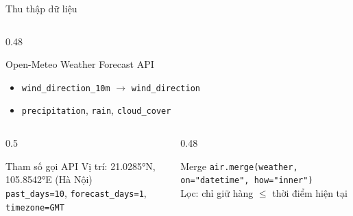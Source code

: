 \documentclass[aspectratio=169]{beamer}
\begin{document}
\begin{frame}{Thu thập dữ liệu}
\begin{columns}[T]
\begin{column}{0.48\textwidth}
\begin{block}{Open-Meteo Weather Forecast API}
\begin{itemize}
          \item \texttt{wind\_direction\_10m} $\to$ \texttt{wind\_direction}
          \item \texttt{precipitation}, \texttt{rain}, \texttt{cloud\_cover}
        \end{itemize}
      \end{block}
    \end{column}
  \end{columns}
  \vspace{0.4em}
  \begin{columns}[T]
    \begin{column}{0.5\textwidth}
      \begin{alertblock}{Tham số gọi API}
        \small
        Vị trí: 21.0285°N, 105.8542°E (Hà Nội)\\
        \texttt{past\_days=10}, \texttt{forecast\_days=1}, \texttt{timezone=GMT}
      \end{alertblock}
    \end{column}
    \begin{column}{0.48\textwidth}
      \begin{alertblock}{Merge}
        \small
        \texttt{air.merge(weather, on="datetime", how="inner")}\\
        Lọc: chỉ giữ hàng $\leq$ thời điểm hiện tại
      \end{alertblock}
    \end{column}
  \end{columns}
\end{frame}
\end{document}

